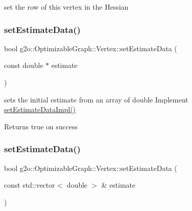 set the row of this vertex in the Hessian 

\mbox{\label{classg2o_1_1_optimizable_graph_1_1_vertex_acebbe12160c0df7c859a349781badc30}} 
\subsubsection{\texorpdfstring{set\+Estimate\+Data()}{setEstimateData()}\hspace{0.1cm}{\footnotesize\ttfamily [1/2]}}
{\footnotesize\ttfamily bool g2o\+::\+Optimizable\+Graph\+::\+Vertex\+::set\+Estimate\+Data (\begin{DoxyParamCaption}\item[{const double $\ast$}]{estimate }\end{DoxyParamCaption})}

sets the initial estimate from an array of double Implement \mbox{\hyperlink{classg2o_1_1_optimizable_graph_1_1_vertex_a35ab439967fd3a3d3e5608e3883d8487}{set\+Estimate\+Data\+Impl()}} \begin{DoxyReturn}{Returns}
true on success 
\end{DoxyReturn}
\mbox{\label{classg2o_1_1_optimizable_graph_1_1_vertex_a1cf16cd3b2e99169cdd6dfc139f926bc}} 
\subsubsection{\texorpdfstring{set\+Estimate\+Data()}{setEstimateData()}\hspace{0.1cm}{\footnotesize\ttfamily [2/2]}}
{\footnotesize\ttfamily bool g2o\+::\+Optimizable\+Graph\+::\+Vertex\+::set\+Estimate\+Data (\begin{DoxyParamCaption}\item[{const std\+::vector$<$ double $>$ \&}]{estimate }\end{DoxyParamCaption})\hspace{0.3cm}{\ttfamily [inline]}}

